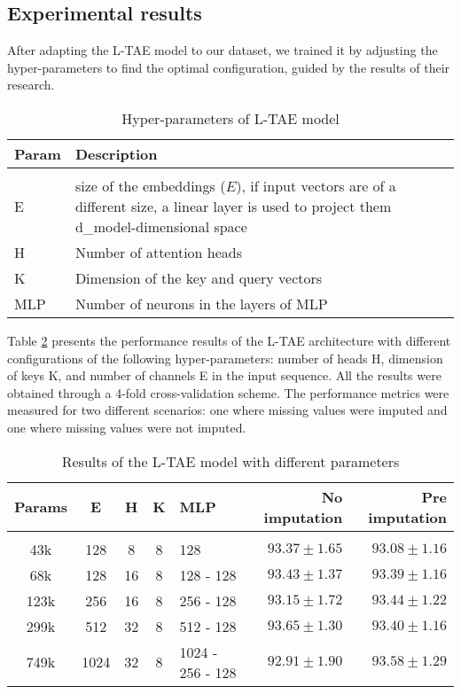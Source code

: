 \subsection{Experimental results}

After adapting the L-TAE model to our dataset, we trained it by adjusting the hyper-parameters to find the optimal configuration, guided by the results of their research.

\begin{table}[ht]
  \centering
  \begin{tabular}{l p{12cm}}   
     Param & Description \\[0.2cm] 
     \hline \\[-0.2cm]  
     E & size of the embeddings ($E$), if input vectors are of a different size, a linear layer is used to project them d\_model-dimensional space \\
     H & Number of attention heads  \\
     K & Dimension of the key and query vectors  \\
     MLP & Number of neurons in the layers of MLP \\
  \end{tabular}
  \caption{Hyper-parameters of L-TAE model}
  \label{tab:LTAEconfig}
\end{table} 


Table \ref{tab:LTAEresults} presents the performance results of the L-TAE architecture with different configurations of the following hyper-parameters: number of heads H, dimension of keys K, and number of channels E in the input sequence.
All the results were obtained through a 4-fold cross-validation scheme.
The performance metrics were measured for two different scenarios: one where missing values were imputed and one where missing values were not imputed.

\begin{table}[ht]
  \centering
  \begin{tabular}{cccclrr} 
     Params & E & H & K & MLP & No imputation & Pre imputation\\[0.2cm] 
     \hline \\[-0.2cm] 
     43k & 	128 & 	8 & 	8 & 	128 & 	$93.37 \pm 1.65$ & 	$93.08 \pm 1.16$\\ 
     68k & 	128 & 	16 & 	8 & 	128 - 128 & 	$93.43 \pm 1.37$ & 	$93.39 \pm 1.16$\\ 
     123k & 	256 & 	16 & 	8 & 	256 - 128 & 	$93.15 \pm 1.72$ & 	$93.44 \pm 1.22$\\ 
     299k & 	512 & 	32 & 	8 & 	512 - 128 & 	$\mathbf{93.65 \pm 1.30}$ & 	$93.40 \pm 1.16$\\ 
     749k & 	1024 & 	32 & 	8 & 	1024 - 256 - 128 & 	$92.91 \pm 1.90$ & 	$\mathbf{93.58 \pm 1.29}$\\ 
  \end{tabular}
  \caption{Results of the L-TAE model with different parameters}
  \label{tab:LTAEresults}
\end{table}

